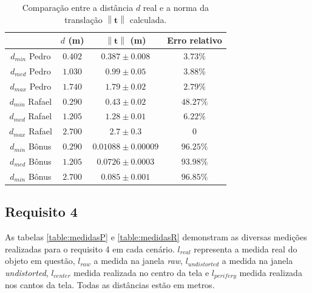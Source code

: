 \documentclass{bmvc2k}
\newcommand{\norm}[1]{\left\lVert#1\right\rVert}
\begin{document}
\begin{table}[htb]
 \small
\caption{Comparação entre a distância $d$ real e a norma da translação $\norm{\bm{t}}$ calculada.}
\label{table:norm}
\centering
\begin{tabular}{| c | c | c | c |}
\hline
& $d$ (m) & $\norm{\bm{t}}$ (m) & Erro relativo\\
\hline
$d_{min}$ Pedro & $0.402$  & $0.387 \pm 0.008$ & $3.73\%$ \\
$d_{med}$ Pedro & $1.030$  & $0.99 \pm 0.05$ & $3.88\%$ \\
$d_{max}$ Pedro & $1.740$  & $1.79 \pm 0.02$ & $2.79\%$ \\
$d_{min}$ Rafael & $0.290$  & $0.43 \pm 0.02$ & $48.27\%$ \\
$d_{med}$ Rafael & $1.205$  & $1.28 \pm 0.01$ & $6.22\%$ \\
$d_{max}$ Rafael & $2.700$  & $2.7 \pm 0.3$ & $0$ \\
$d_{min}$ Bônus & $0.290$  & $0.01088 \pm 0.00009$ & $96.25\%$ \\
$d_{med}$ Bônus & $1.205$  & $0.0726 \pm 0.0003$ & $93.98\%$ \\
$d_{min}$ Bônus & $2.700$  & $0.085 \pm 0.001$ & $96.85\%$ \\
\hline
\end{tabular}
\end{table}

\subsection{Requisito 4}
As tabelas \ref{table:medidasP} e \ref{table:medidasR} demonstram as diversas medições realizadas para o requisito 4 em cada cenário. $l_{real}$ representa a medida real do objeto em questão, $l_{raw}$ a medida na janela \textit{raw}, $l_{undistorted}$ a medida na janela \textit{undistorted}, $l_{center}$ medida realizada no centro da tela e $l_{perifery}$ medida realizada nos cantos da tela. Todas as distâncias estão em metros.
\end{document}
